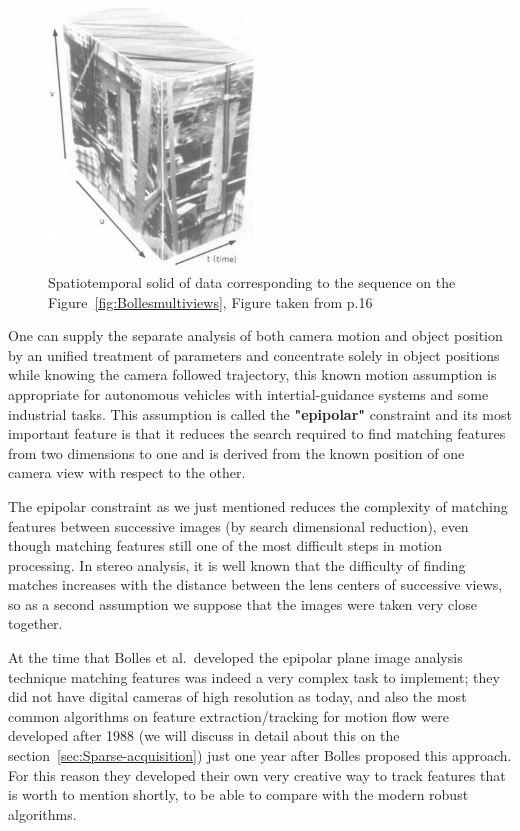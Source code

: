 \begin{figure}[h!]
\centering
\includegraphics[width= 0.50\textwidth]{./Diagrams/block1.jpg}
\caption{Spatiotemporal solid of data corresponding to the sequence on the Figure~\ref{fig:Bollesmultiviews}, Figure taken from \cite{Bolles} p.16}
\end{figure}


\bigskip

One can supply the separate analysis of both camera motion and object position by an unified treatment of parameters and concentrate solely in object positions while knowing the camera followed trajectory, this known motion assumption is appropriate for autonomous vehicles with intertial-guidance systems and some industrial tasks. This assumption is called the \textbf{"epipolar"} constraint and its most important feature is that it reduces the search required to find matching features from two dimensions to one and is derived from the known position of one camera view with respect to the other. 

\bigskip

The epipolar constraint as we just mentioned reduces the complexity of matching features between successive images (by search dimensional reduction), even though matching features still one of the most difficult steps in motion processing. In stereo analysis, it is well known that the difficulty of finding matches increases with the distance between the lens centers of successive views, so as a second assumption we suppose that the images were taken very close together. 

\bigskip 

At the time that Bolles et al.\ developed the epipolar plane image analysis technique matching features was indeed a very complex task to implement; they did not have digital cameras of high resolution as today, and also the most common algorithms on feature extraction/tracking for motion flow were developed after 1988 (we will discuss in detail about this on the section~\ref{sec:Sparse-acquisition}) just one year after Bolles proposed this approach. For this reason they developed their own very creative way to track features that is worth to mention shortly, to be able to compare with the modern robust algorithms.  

